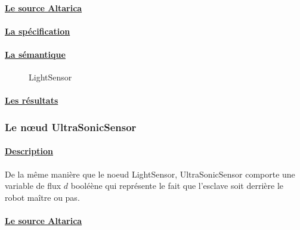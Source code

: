     \paragraph{\underline{Le source Altarica\\}}
    
   
    \paragraph{\underline{La spécification\\}}
    

    \paragraph{\underline{La sémantique\\}}
    \begin{figure}[!ht]
     \begin{center}
      \caption{LightSensor}
     \end{center}
    \end{figure}

    \paragraph{\underline{Les résultats\\}}
    
    
   
   \subsubsection{Le n\oe{}ud UltraSonicSensor}
   
    \paragraph{\underline{Description\\}}
    De la même manière que le noeud LightSensor, UltraSonicSensor
    comporte une variable de flux $d$ booléène qui représente le fait
    que l'esclave soit derrière le robot maître ou pas.

    \paragraph{\underline{Le source Altarica\\}}
    
    
